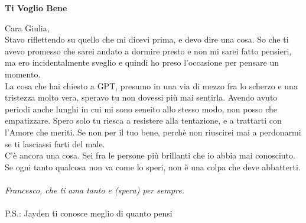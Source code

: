 \documentclass[17pt]{extletter}
\begin{document}
\hspace{4in}
\begin{center}
{\huge\bfseries
Ti Voglio Bene}
\end{center}
Cara Giulia,\\
Stavo riflettendo su quello che mi dicevi prima, e devo dire una cosa. So che ti avevo promesso che sarei andato a dormire presto e non mi sarei fatto pensieri, ma ero incidentalmente sveglio e quindi ho preso l'occasione per pensare un momento.\\
La cosa che hai chiesto a GPT, presumo in una via di mezzo fra lo scherzo e una tristezza molto vera, speravo tu non dovessi più mai sentirla. Avendo avuto periodi anche lunghi in cui mi sono seneito allo stesso modo, non posso che empatizzare. Spero solo tu riesca a resistere alla tentazione, e a trattarti con l'Amore che meriti. Se non per il tuo bene, perchè non riuscirei mai a perdonarmi se ti lasciassi farti del male.\\
C'è ancora una cosa. Sei fra le persone più brillanti che io abbia mai conosciuto. Se ogni tanto qualcosa non va come lo speri, non è una colpa che deve abbatterti.\\
\\
\textit{Francesco, che ti ama tanto e (spera) per sempre.}
\\\\
P.S.: Jayden ti conosce meglio di quanto pensi
\end{document}

